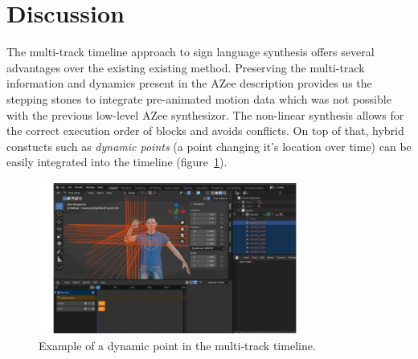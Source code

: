 \documentclass[../../main.tex]{subfiles}
\begin{document}
\section{Discussion}
\label{ch:multi_track:discussion}

The multi-track timeline approach to sign language synthesis offers several advantages over the existing existing method. Preserving the multi-track information and dynamics present in the AZee description provides us the stepping stones to integrate pre-animated motion data which was not possible with the previous low-level AZee synthesizor. The non-linear synthesis allows for the correct execution order of blocks and avoids conflicts. On top of that, hybrid constucts such as \emph{dynamic points} (a point changing it's location over time) can be easily integrated into the timeline (figure~\ref{fig:dynpoint_example}).

\begin{figure}[h]
    \centering
    \includegraphics[width=0.8\textwidth]{chapters/multi_track/images/dynpoint_example.png}
    \caption{Example of a dynamic point in the multi-track timeline.}
    \label{fig:dynpoint_example}
\end{figure}
\end{document}
